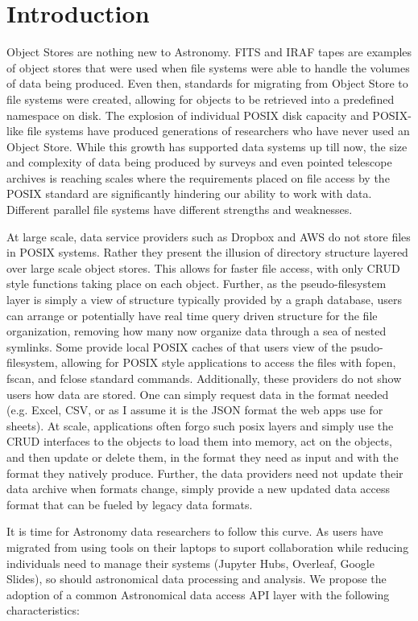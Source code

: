 \section{Introduction} \label{sec:intro}

Object Stores are nothing new to Astronomy.  FITS and IRAF tapes are examples
of object stores that were used when file systems were able to handle the volumes 
of data being produced. Even then, standards for migrating from Object Store to file 
systems were created, allowing for objects to be retrieved into a predefined namespace
on disk.  The explosion of individual POSIX disk capacity and POSIX-like file systems
have produced generations of researchers who have never used an Object Store. While
this growth has supported data systems up till now, the size and complexity of
data being produced by surveys and even pointed telescope archives is reaching
scales where the requirements placed on file access by the POSIX standard are 
significantly hindering our ability to work with data.  Different parallel file systems
have different strengths and weaknesses.  

At large scale, data service providers such as Dropbox and AWS do not store files
in POSIX systems.  Rather they present the illusion of directory structure layered over 
large scale object stores. This allows for faster file access, with only CRUD style
functions taking place on each object.  Further, as the pseudo-filesystem layer is simply a 
view of structure typically provided by a graph database, users can arrange or potentially
have real time query driven structure for the file organization, removing how many now 
organize data through a sea of nested symlinks.
Some provide local POSIX caches of that users view of the 
psudo-filesystem, allowing for POSIX style applications to access the files with
fopen, fscan, and fclose standard commands. Additionally, these providers do 
not show users how data are stored. One can simply request data in the format 
needed (e.g. Excel, CSV, or as I assume it is the JSON format the web apps
use for sheets).   At scale, applications often forgo
such posix layers and simply use the CRUD interfaces to the objects to load them into 
memory, act on the objects, and then update or delete them, in the format they need
as input and with the format they natively produce. Further, the data providers need
not update their data archive when formats change, simply provide a new updated
data access format that can be fueled by legacy data formats.

It is time for Astronomy data researchers to follow this curve. As users have migrated
from using tools on their laptops to suport collaboration while reducing
individuals need to manage their systems (Jupyter Hubs, Overleaf, Google Slides), 
so should astronomical data processing and analysis. We propose the adoption of
a common Astronomical data access API layer with the following characteristics:



